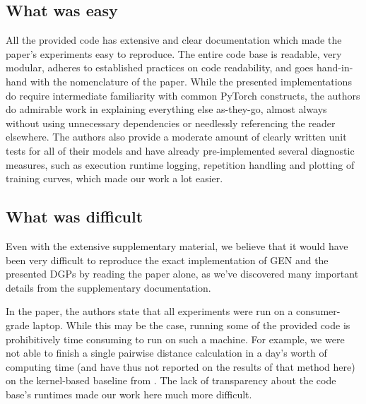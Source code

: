 
\subsection{What was easy}

All the provided code has extensive and clear documentation which made the paper's experiments easy to reproduce. The entire code base is readable, very modular, adheres to established practices on code readability, and goes hand-in-hand with the nomenclature of the paper. While the presented implementations do require intermediate familiarity with common PyTorch constructs, the authors do admirable work in explaining everything else as-they-go, almost always without using unnecessary dependencies or needlessly referencing the reader elsewhere. The authors also provide a moderate amount of clearly written unit tests for all of their models and have already pre-implemented several diagnostic measures, such as execution runtime logging, repetition handling and plotting of training curves, which made our work a lot easier.



\subsection{What was difficult}

Even with the extensive supplementary material, we believe that it would have been very difficult to reproduce the exact implementation of GEN and the presented DGPs by reading the paper alone, as we've discovered many important details from the supplementary documentation. 

In the paper, the authors state that all experiments were run on a consumer-grade laptop. While this may be the case, running some of the provided code is prohibitively time consuming to run on such a machine. For example, we were not able to finish a single pairwise distance calculation in a day's worth of computing time (and have thus not reported on the results of that method here) on  the kernel-based baseline from \cite{paassen2018time}. The lack of transparency about the code base's runtimes made our work here much more difficult.

